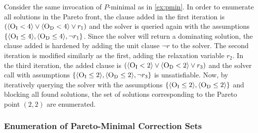\begin{example}
  Consider the same invocation of $P$-minimal as in \cref{ex:pmin}.
  In order to enumerate all solutions in the Pareto front, the clause added in the first iteration is $(\langle \textsc{O}_{\text{I}} < 4 \rangle \lor \langle \textsc{O}_{\text{D}} < 4 \rangle \lor r_1)$ and the solver is queried again with the assumptions $\{ \langle \textsc{O}_{\text{I}} \leq 4 \rangle, \langle \textsc{O}_{\text{D}} \leq 4 \rangle, \lnot r_1 \}$.
  Since the solver will return a dominating solution, the clause added is hardened by adding the unit clause $\lnot r$ to the solver.
  The second iteration is modified similarly as the first, adding the relaxation variable $r_2$.
  In the third iteration, the added clause is $(\langle \textsc{O}_{\text{I}} < 2 \rangle \lor \langle \textsc{O}_{\text{D}} < 2 \rangle \lor r_3)$ and the solver call with assumptions $\{ \langle \textsc{O}_{\text{I}} \leq 2 \rangle, \langle \textsc{O}_{\text{D}} \leq 2 \rangle, \lnot r_3 \}$ is unsatisfiable.
  Now, by iteratively querying the solver with the assumptions $\{ \langle \textsc{O}_{\text{I}} \leq 2 \rangle, \langle \textsc{O}_{\text{D}} \leq 2 \rangle \}$ and blocking all found solutions, the set of solutions corresponding to the Pareto point $(2,2)$ are enumerated.
\end{example}

\subsubsection{Enumeration of Pareto-Minimal Correction Sets\label{sec:pareto-mcs}}

